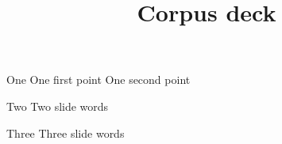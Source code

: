 \documentclass{beamer}
\title{Corpus deck}
\begin{document}
\begin{frame}{One}
  One first point \pause One second point
\end{frame}
\begin{frame}{Two}
  Two slide words
\end{frame}
\begin{frame}{Three}
  Three slide words
\end{frame}
\end{document}
